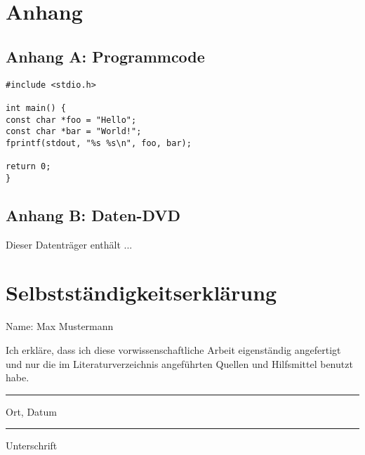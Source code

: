 \documentclass[a4paper,12pt,ngerman,oneside]{scrreprt}	%
\begin{document}
	
	
	\chapter*{Anhang}

		\section*{Anhang A: Programmcode}
			
			{\renewcommand*{\ttdefault}{txtt}
				\begin{lstlisting}				
#include <stdio.h>

int main() {
const char *foo = "Hello";
const char *bar = "World!";
fprintf(stdout, "%s %s\n", foo, bar);

return 0;
}
				\end{lstlisting}
			}
		
		
		
		
		
			
	\newpage
	\vspace*{2cm}	
	\section*{Anhang B: Daten-DVD}
	\begin{center}
		\hspace*{-1cm}
	\end{center}
	Dieser Datenträger enthält ...
	
	\chapter*{Selbstständigkeitserklärung}
	Name: Max Mustermann\newline
	
	Ich erkläre, dass ich diese vorwissenschaftliche Arbeit eigenständig angefertigt und nur die im Literaturverzeichnis angeführten Quellen und Hilfsmittel benutzt habe.
	
	\vspace{3cm}
	
	
	\parbox{6cm}{\centering\hrule
	\strut \centering\footnotesize Ort, Datum} \hfill\parbox{6cm}{\hrule
	\strut \centering\footnotesize Unterschrift}
	
	
\end{document}
